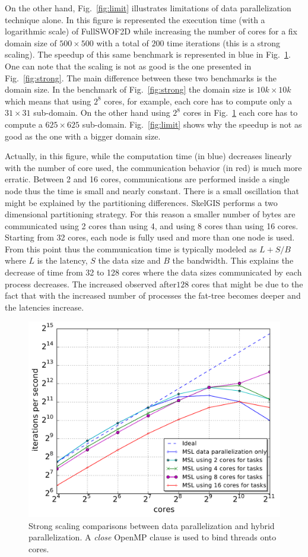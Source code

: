 On the other hand, Fig.~\ref{fig:limit} illustrates limitations of data parallelization technique alone. In this figure is represented the execution time (with a logarithmic scale) of FullSWOF2D while increasing the number of cores for a fix domain size of $500 \times 500$ with a total of $200$ time iterations (\ie this is a strong scaling). The speedup of this same benchmark is represented in blue in Fig.~\ref{fig:close}. One can note that the scaling is not as good is the one presented in Fig.~\ref{fig:strong}. 
The main difference between these two benchmarks is the domain size. In the benchmark of Fig.~\ref{fig:strong} the domain size is $10k \times 10k$ which means that using $2^8$ cores, for example, each core has to compute only a $31 \times 31$ sub-domain. On the other hand using $2^8$ cores in Fig.~\ref{fig:close} each core has to compute a $625 \times 625$ sub-domain. Fig.~\ref{fig:limit} shows why the speedup is not as good as the one with a bigger domain size.  

Actually, in this figure, while the computation time (in blue) decreases linearly with the number of core used, the communication behavior (in red) is much more erratic. Between 2 and 16 cores, communications are performed inside a single node thus the time is small and nearly constant. There is a small oscillation that might be explained by the partitioning differences. SkelGIS performs a two dimensional partitioning strategy. For this reason a smaller number of bytes are communicated using 2 cores than using 4, and using 8 cores than using 16 cores. Starting from 32 cores, each node is fully used and more than one node is used. From this point thus the communication time is typically modeled as $L+S/B$ where $L$ is the latency, $S$ the data size and $B$ the bandwidth. This explains the decrease of time from 32 to 128 cores where the data sizes communicated by each process decreases. The increased observed after$128$ cores that might be due to the fact that with the increased number of processes the fat-tree becomes deeper and the latencies increase.

\begin{figure}[th]\begin{center}
  \includegraphics[width=.6\textwidth]{../results/task_scaling/500_200/base_close_median.pdf}
  \caption{Strong scaling comparisons between data parallelization and hybrid parallelization. A \emph{close} OpenMP clause is used to bind threads onto cores.}
  \label{fig:close}
\end{center}\end{figure}

